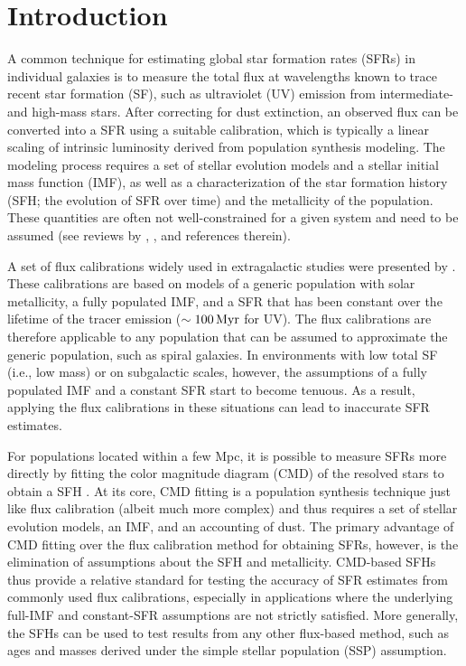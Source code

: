\section{Introduction}

A common technique for estimating global star formation rates (SFRs) in
individual galaxies is to measure the total flux at wavelengths known to trace
recent star formation (SF), such as ultraviolet (UV) emission from
intermediate- and high-mass stars. After correcting for dust extinction, an
observed flux can be converted into a SFR using a suitable calibration, which
is typically a linear scaling of intrinsic luminosity derived from population
synthesis modeling. The modeling process requires a set of stellar evolution
models and a stellar initial mass function (IMF), as well as a characterization
of the star formation history (SFH; the evolution of SFR over time) and the
metallicity of the population. These quantities are often not well-constrained
for a given system and need to be assumed (see reviews by
\citealt{Kennicutt:1998}, \citealt{Kennicutt:2012}, and references therein).

A set of flux calibrations widely used in extragalactic studies were presented
by \citet[][see \citealp{Kennicutt:2012} for updates]{Kennicutt:1998}. These
calibrations are based on models of a generic population with solar
metallicity, a fully populated IMF, and a SFR that has been constant over the
lifetime of the tracer emission ($\sim 100\,\mathrm{Myr}$ for UV). The flux calibrations
are therefore applicable to any population that can be assumed to approximate
the generic population, such as spiral galaxies. In environments with low total
SF (i.e., low mass) or on subgalactic scales, however, the assumptions of a
fully populated IMF and a constant SFR start to become tenuous. As a result,
applying the flux calibrations in these situations can lead to inaccurate SFR
estimates.

For populations located within a few Mpc, it is possible to measure SFRs more
directly by fitting the color magnitude diagram (CMD) of the resolved stars to
obtain a SFH \citep{Dolphin:2002}. At its core, CMD fitting is a population
synthesis technique just like flux calibration (albeit much more complex) and
thus requires a set of stellar evolution models, an IMF, and an accounting of
dust. The primary advantage of CMD fitting over the flux calibration method for
obtaining SFRs, however, is the elimination of assumptions about the SFH and
metallicity. CMD-based SFHs thus provide a relative standard for testing the
accuracy of SFR estimates from commonly used flux calibrations, especially in
applications where the underlying full-IMF and constant-SFR assumptions are not
strictly satisfied. More generally, the SFHs can be used to test results from
any other flux-based method, such as ages and masses derived under the simple
stellar population (SSP) assumption.

